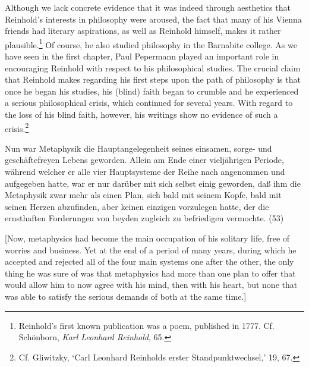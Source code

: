 Although we lack concrete evidence that it was indeed through aesthetics that Reinhold's interests in philosophy were aroused, the fact that many of his Vienna friends had literary aspirations, as well as Reinhold himself, makes it rather plausible.\footnote{ Reinhold's first known publication was a poem, published in 1777. Cf. Sch\"{o}nborn, \textit{Karl Leonhard Reinhold}, 65. } Of course, he also studied philosophy in the Barnabite college. As we have seen in the first chapter, Paul Pepermann played an important role in encouraging Reinhold with respect to his philosophical studies. The crucial claim that Reinhold makes regarding his first steps upon the path of philosophy is that once he began his studies, his (blind) faith began to crumble and he experienced a serious philosophical crisis, which continued for several years. With regard to the loss of his blind faith, however, his writings show no evidence of such a crisis.\footnote{ Cf. Gliwitzky, `Carl Leonhard Reinholds erster Standpunktwechsel,' 19, 67.} 

Nun war Metaphysik die Hauptangelegenheit seines einsamen, sorge{-} und gesch\"{a}ftefreyen Lebens geworden. Allein am Ende einer vielj\"{a}hrigen Periode, w\"{a}hrend welcher er alle vier Hauptsysteme der Reihe nach angenommen und aufgegeben hatte, war er nur dar\"{u}ber mit sich selbst einig geworden, da\ss{} ihm die Metaphysik zwar mehr als einen Plan, sich bald mit seinem Kopfe, bald mit seinen Herzen abzufinden, aber keinen einzigen vorzulegen hatte, der die ernsthaften Forderungen von beyden zugleich zu befriedigen vermochte. (53)

[Now, metaphysics had become the main occupation of his solitary life, free of worries and business. Yet at the end of a period of many years, during which he accepted and rejected all of the four main systems one after the other, the only thing he was sure of was that metaphysics had more than one plan to offer that would allow him to now agree with his mind, then with his heart, but none that was able to satisfy the serious demands of both at the same time.]


